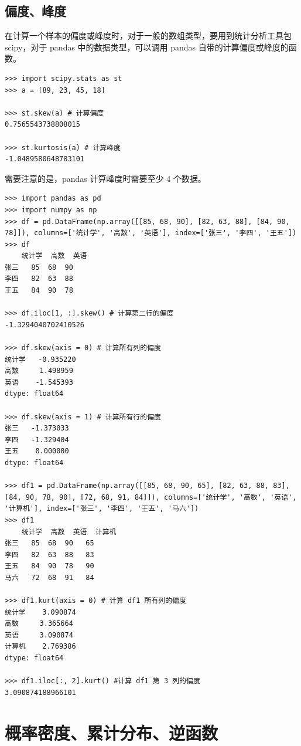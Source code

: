 \subsection{偏度、峰度}

在计算一个样本的偏度或峰度时，对于一般的数组类型，要用到统计分析工具包 scipy，对于 pandas 中的数据类型，可以调用 pandas 自带的计算偏度或峰度的函数。


\begin{lstlisting}[Language=Python]
>>> import scipy.stats as st
>>> a = [89, 23, 45, 18]

>>> st.skew(a) # 计算偏度
0.7565543738808015

>>> st.kurtosis(a) # 计算峰度
-1.0489580648783101
\end{lstlisting}


需要注意的是，pandas 计算峰度时需要至少 4 个数据。
\begin{lstlisting}[Language=Python]
>>> import pandas as pd
>>> import numpy as np
>>> df = pd.DataFrame(np.array([[85, 68, 90], [82, 63, 88], [84, 90, 78]]), columns=['统计学', '高数', '英语'], index=['张三', '李四', '王五'])
>>> df
    统计学  高数  英语
张三   85  68  90
李四   82  63  88
王五   84  90  78

>>> df.iloc[1, :].skew() # 计算第二行的偏度
-1.3294040702410526

>>> df.skew(axis = 0) # 计算所有列的偏度
统计学   -0.935220
高数     1.498959
英语    -1.545393
dtype: float64

>>> df.skew(axis = 1) # 计算所有行的偏度
张三   -1.373033
李四   -1.329404
王五    0.000000
dtype: float64

>>> df1 = pd.DataFrame(np.array([[85, 68, 90, 65], [82, 63, 88, 83], [84, 90, 78, 90], [72, 68, 91, 84]]), columns=['统计学', '高数', '英语', '计算机'], index=['张三', '李四', '王五', '马六'])
>>> df1
    统计学  高数  英语  计算机
张三   85  68  90   65
李四   82  63  88   83
王五   84  90  78   90
马六   72  68  91   84

>>> df1.kurt(axis = 0) # 计算 df1 所有列的偏度
统计学    3.090874
高数     3.365664
英语     3.090874
计算机    2.769386
dtype: float64

>>> df1.iloc[:, 2].kurt() #计算 df1 第 3 列的偏度
3.090874188966101
\end{lstlisting}

\section{概率密度、累计分布、逆函数}

